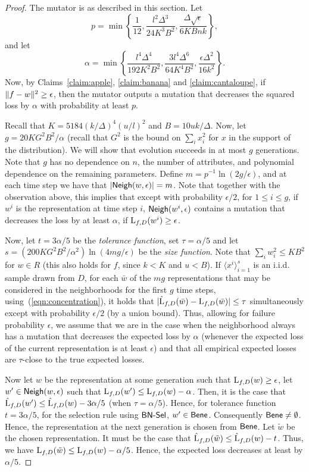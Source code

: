 \begin{proof}
The mutator is as described in this section. Let 
\[ p = \min\left\{\frac{1}{12}, \frac{l^2\Delta^3}{24K^3B^2}, \frac{\Delta
\sqrt{\epsilon}}{6KBnk}\right\},\] 
and let 
\[ \alpha = \min\left\{\frac{l^4 \Delta^4}{192 K^2B^2}, \frac{3 l^4
\Delta^6}{64K^4B^2}, \frac{\epsilon\Delta^2}{16k^2}\right\}.\] 
Now, by Claims~\ref{claim:apple}, \ref{claim:banana} and \ref{claim:cantaloupe},
if $\Vert f - w \Vert^2 \geq \epsilon$, then the mutator outputs a mutation that
decreases the squared loss by $\alpha$ with probability at least $p$.

Recall that $K = 5184 (k/\Delta)^4 (u/l)^2$ and $B = 10uk/\Delta$.  Now, let $g
= 20 K G^2 B^2/\alpha$ (recall that $G^2$ is the bound on $\sum_{i} x_i^2$ for
$x$ in the support of the distribution). We will show that evolution succeeds in
at most $g$ generations. Note that $g$ has no dependence on $n$, the number of
attributes, and polynomial dependence on the remaining parameters. Define $m =
p^{-1} \ln(2g /\epsilon)$, and at each time step we have that $|\mathsf{Neigh}(w,
\epsilon)| = m$.  Note that together with the observation above, this implies
that except with probability $\epsilon/2$, for $1 \leq i \leq g$, if $w^i$ is
the representation at time step $i$, $\mathsf{Neigh}(w^i, \epsilon)$ contains a mutation
that decreases the loss by at least $\alpha$, if $\mathrm{L}_{f, D}(w^i) \geq
\epsilon$. 

Now, let $t = 3\alpha / 5$ be the \emph{tolerance function}, set $\tau =
\alpha/5$ and let $s = (200 KG^2B^2/\alpha^2) \ln(4mg/\epsilon)$ be the
\emph{size function}. Note that $\sum_{i} w_i^2 \leq KB^2$ for $w \in R$ (this
also holds for $f$, since $k < K$ and $u < B$). If $\langle x^i \rangle_{i=1}^s$
is an i.i.d. sample drawn from $D$, for each $\bar{w}$ of the $mg$
representations that may be considered in the neighborhoods for the first $g$
time steps, using~(\ref{eqn:concentration}), it holds that $|\hat{\mathrm{L}}_{f,
D}(\bar{w}) - \mathrm{L}_{f, D}(\bar{w})| \leq \tau$ simultaneously except with
probability $\epsilon/2$ (by a union bound). Thus, allowing for failure
probability $\epsilon$, we assume that we are in the case when the neighborhood
always has a mutation that decreases the expected loss by $\alpha$ (whenever the
expected loss of the current representation is at least $\epsilon$) and that all
empirical expected losses are $\tau$-close to the true expected losses.

Now let $w$ be the representation at some generation such that $\mathrm{L}_{f, D}(w)
\geq \epsilon$, let $w^\prime \in \mathsf{Neigh}(w, \epsilon)$ such that $\mathrm{L}_{f,
D}(w^\prime) \leq \mathrm{L}_{f, D}(w) - \alpha$. Then, it is the case that
$\hat{\mathrm{L}}_{f, D}(w^\prime) \leq \hat{\mathrm{L}}_{f, D}(w) - 3\alpha/5$ (when
$\tau = \alpha/5$). Hence, for tolerance function $t = 3 \alpha/5$, for the
selection rule using $\mathsf{BN\mbox{-}Sel}$, $w^\prime \in \mathsf{Bene}$. Consequently $\mathsf{Bene} \neq
\emptyset$. Hence, the representation at the next generation is chosen from
$\mathsf{Bene}$. Let $\tilde{w}$ be the chosen representation. It must be the case that
$\hat{\mathrm{L}}_{f, D}(\tilde{w}) \leq \hat{\mathrm{L}}_{f, D}(w) - t$. Thus, we have
$\mathrm{L}_{f, D}(\tilde{w}) \leq \mathrm{L}_{f, D}(w) - \alpha/5$. Hence, the expected
loss decreases at least by $\alpha/5$.


\end{proof}
